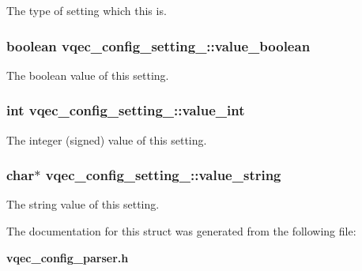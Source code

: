 The type of setting which this is. 
\subsubsection{\setlength{\rightskip}{0pt plus 5cm}boolean \bf{vqec\_\-config\_\-setting\_\-::value\_\-boolean}}\label{structvqec__config__setting___93ad9c050b8708ee725c2e2be96d696e}


The boolean value of this setting. 
\subsubsection{\setlength{\rightskip}{0pt plus 5cm}int \bf{vqec\_\-config\_\-setting\_\-::value\_\-int}}\label{structvqec__config__setting___9fc2ce97866bd2b48d20365eace271f6}


The integer (signed) value of this setting. 
\subsubsection{\setlength{\rightskip}{0pt plus 5cm}char$\ast$ \bf{vqec\_\-config\_\-setting\_\-::value\_\-string}}\label{structvqec__config__setting___7b69facf97b03c8f8baeb2b8eed36076}


The string value of this setting. 

The documentation for this struct was generated from the following file:\begin{CompactItemize}
\item 
\bf{vqec\_\-config\_\-parser.h}\end{CompactItemize}
